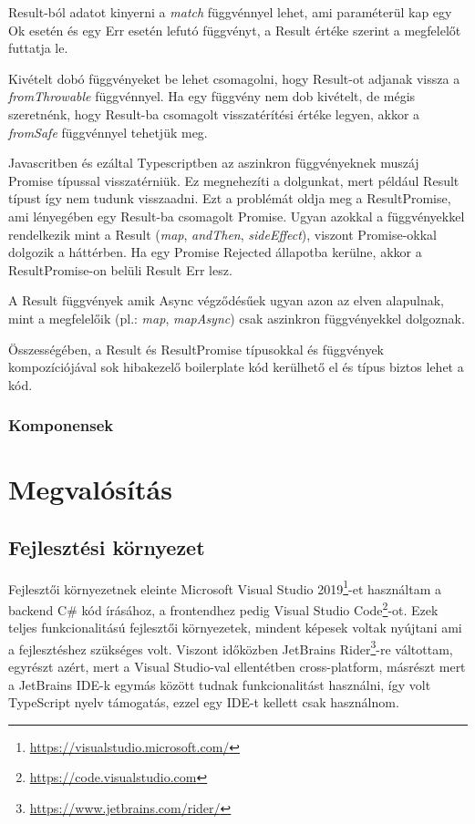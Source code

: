 Result-ból adatot kinyerni a \textit{match} függvénnyel lehet, ami paraméterül kap egy Ok esetén és egy Err esetén lefutó függvényt, a Result értéke szerint a megfelelőt futtatja le.

Kivételt dobó függvényeket be lehet csomagolni, hogy Result-ot adjanak vissza a \textit{fromThrowable} függvénnyel. Ha egy függvény nem dob kivételt, de mégis szeretnénk, hogy Result-ba csomagolt visszatérítési értéke legyen, akkor a \textit{fromSafe} függvénnyel tehetjük meg.

Javascritben és ezáltal Typescriptben az aszinkron függvényeknek muszáj Promise típussal visszatérniük. Ez megnehezíti a dolgunkat, mert például Result típust így nem tudunk visszaadni. Ezt a problémát oldja meg a ResultPromise, ami lényegében egy Result-ba csomagolt Promise. Ugyan azokkal a függvényekkel rendelkezik mint a Result (\textit{map}, \textit{andThen}, \textit{sideEffect}), viszont Promise-okkal dolgozik a háttérben. Ha egy Promise Rejected állapotba kerülne, akkor a ResultPromise-on belüli Result Err lesz.

A Result függvények amik Async végződésűek ugyan azon az elven alapulnak, mint a megfelelőik (pl.: \textit{map}, \textit{mapAsync}) csak aszinkron függvényekkel dolgoznak.

Összességében, a Result és ResultPromise típusokkal és függvények kompozíciójával sok hibakezelő boilerplate kód kerülhető el és típus biztos lehet a kód.

\subsubsection{Komponensek}


\clearpage

\section{Megvalósítás}
\subsection{Fejlesztési környezet}

Fejlesztői környezetnek eleinte Microsoft Visual Studio 2019\footnote{\url{https://visualstudio.microsoft.com/}}-et használtam a backend C\# kód írásához, a frontendhez pedig Visual Studio Code\footnote{\url{https://code.visualstudio.com}}-ot. Ezek teljes funkcionalitású fejlesztői környezetek, mindent képesek voltak nyújtani ami a fejlesztéshez szükséges volt. Viszont időközben JetBrains Rider\footnote{\url{https://www.jetbrains.com/rider/}}-re váltottam, egyrészt azért, mert a Visual Studio-val ellentétben cross-platform, másrészt mert a JetBrains IDE-k egymás között tudnak funkcionalitást használni, így volt TypeScript nyelv támogatás, ezzel egy IDE-t kellett csak használnom.

